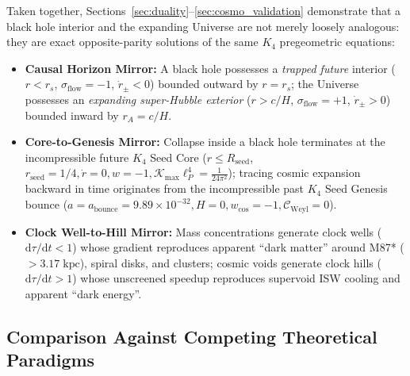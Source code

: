 \documentclass[11pt,a4paper]{article}
\theoremstyle{remark}
\begin{document}
Taken together, Sections~\ref{sec:duality}--\ref{sec:cosmo_validation} demonstrate that a black hole interior and the expanding Universe are not merely loosely analogous: they are exact opposite-parity solutions of the same $K_4$ pregeometric equations:
\begin{itemize}
  \item \textbf{Causal Horizon Mirror:} A black hole possesses a \emph{trapped future} interior ($r < r_s$, $\sigma_{\mathrm{flow}} = -1$, $\dot{r}_\pm < 0$) bounded outward by $r = r_s$; the Universe possesses an \emph{expanding super-Hubble exterior} ($r > c/H$, $\sigma_{\mathrm{flow}} = +1$, $\dot{r}_\pm > 0$) bounded inward by $r_A = c/H$.
  \item \textbf{Core-to-Genesis Mirror:} Collapse inside a black hole terminates at the incompressible future $K_4$ Seed Core ($r \le R_{\mathrm{seed}}$, $r_{\mathrm{seed}} = 1/4, \dot{r} = 0, w = -1, \mathcal{K}_{\max}\ell_P^4 = \frac{1}{24\pi^2}$); tracing cosmic expansion backward in time originates from the incompressible past $K_4$ Seed Genesis bounce ($a = a_{\mathrm{bounce}} = 9.89 \times 10^{-32}, H = 0, w_{\mathrm{cos}} = -1, \mathcal{C}_{\mathrm{Weyl}} = 0$).
  \item \textbf{Clock Well-to-Hill Mirror:} Mass concentrations generate clock wells ($\mathrm{d}\tau/\mathrm{d}t < 1$) whose gradient reproduces apparent ``dark matter'' around M87* ($> 3.17\;\mathrm{kpc}$), spiral disks, and clusters; cosmic voids generate clock hills ($\mathrm{d}\tau/\mathrm{d}t > 1$) whose unscreened speedup reproduces supervoid ISW cooling and apparent ``dark energy''.
\end{itemize}

\subsection{Comparison Against Competing Theoretical Paradigms}
\end{document}
